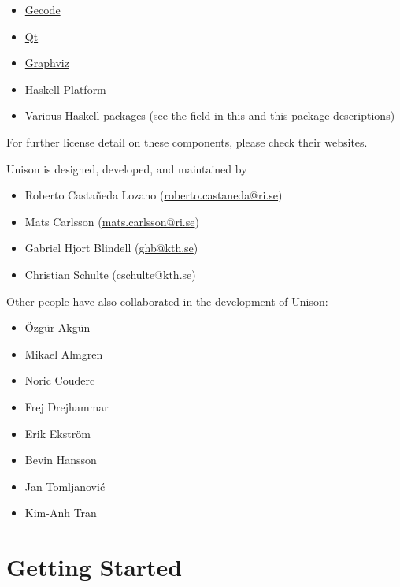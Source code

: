 \documentclass[11pt]{report}
\begin{document}
\begin{itemize}
\item \href{http://www.gecode.org/}{Gecode}
\item \href{https://www.qt.io/}{Qt}
\item \href{http://www.graphviz.org/}{Graphviz}
\item \href{https://www.haskell.org/platform/}{Haskell Platform}
\item Various Haskell packages (see the  field in
  \href{https://github.com/unison-code/unison/blob/master/src/unison/unison.cabal}{this}
  and
  \href{https://github.com/unison-code/unison/blob/master/src/unison-specsgen/unison-specsgen.cabal}{this}
  package descriptions)
\end{itemize}

For further license detail on these components, please check their websites.

Unison is designed, developed, and maintained by

\begin{itemize}
\item Roberto Castañeda Lozano (\href{mailto:roberto.castaneda@ri.se}{roberto.castaneda@ri.se})
\item Mats Carlsson (\href{mailto:mats.carlsson@ri.se}{mats.carlsson@ri.se})
\item Gabriel Hjort Blindell (\href{mailto:ghb@kth.se}{ghb@kth.se})
\item Christian Schulte (\href{mailto:cschulte@kth.se}{cschulte@kth.se})
\end{itemize}

Other people have also collaborated in the development of Unison:
%
\begin{itemize}
\item Özgür Akgün
\item Mikael Almgren
\item Noric Couderc
\item Frej Drejhammar
\item Erik Ekström
\item Bevin Hansson
\item Jan Tomljanović
\item Kim-Anh Tran
\end{itemize}

\chapter{Getting Started}%
\label{sec:getting-started}
\end{document}

